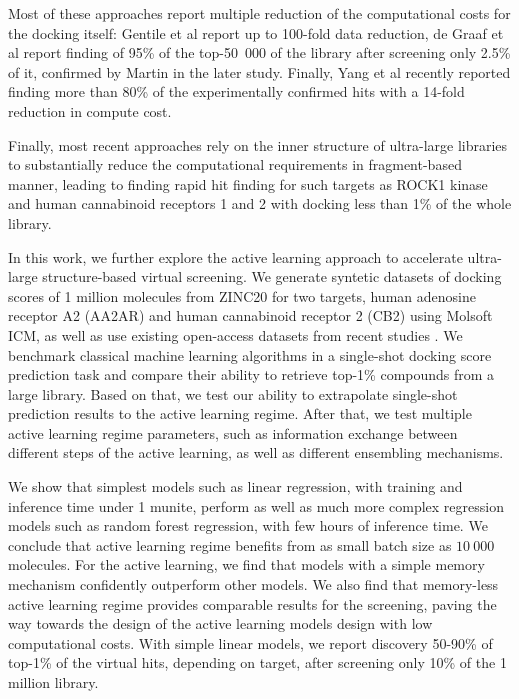 Most of these approaches report multiple reduction of the computational costs for the docking itself: Gentile et al report up to 100-fold data reduction, de Graaf et al report finding of 95\% of the top-50\ 000 of the library after screening only 2.5\% of it, confirmed by Martin \cite{logistic_regression} in the later study. Finally, Yang et al \cite{Yang2021_shoichet_active_learning} recently reported finding more than 80\% of the experimentally confirmed hits with a 14-fold reduction in compute cost.

Finally, most recent approaches \cite{Sadybekov2021_vsynthes,beroza_chemical_2022} rely on the inner structure of ultra-large libraries to substantially reduce the computational requirements in fragment-based manner, leading to finding rapid hit finding for such targets as ROCK1 kinase and human cannabinoid receptors 1 and 2 with docking less than 1\% of the whole library.




In this work, we further explore the active learning approach to accelerate ultra-large structure-based virtual screening. We generate syntetic datasets of docking scores of 1 million molecules from ZINC20 \cite{Irwin2020ZINC20Discovery} for two targets, human adenosine receptor A2 (AA2AR) and human cannabinoid receptor 2 (CB2) using Molsoft ICM, as well as use existing open-access datasets from recent studies \cite{ultralarge_docking_first}. We benchmark classical machine learning algorithms in a single-shot docking score prediction task and compare their ability to retrieve top-1\% compounds from a large library. Based on that, we test our ability to extrapolate single-shot prediction results to the active learning regime. After that, we test multiple active learning regime parameters, such as information exchange between different steps of the active learning, as well as different ensembling mechanisms.

We show that simplest models such as linear regression, with training and inference time under 1 munite, perform as well as much more complex regression models such as random forest regression, with few hours of inference time. We conclude that active learning regime benefits from as small batch size as $10\ 000$ molecules. For the active learning, we find that models with a simple memory mechanism confidently outperform other models. We also find that memory-less active learning regime provides comparable results for the screening, paving the way towards the design of the active learning models design with low computational costs. With simple linear models, we report discovery 50-90\% of top-1\% of the virtual hits, depending on target, after screening only 10\% of the 1 million library.
 
